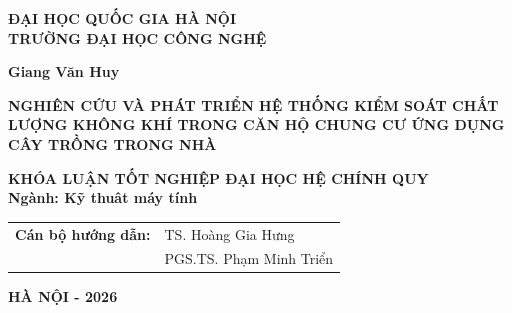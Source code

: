 \begin{titlepage}

	\begin{center}
		{\fontsize{12}{1.3}\selectfont \textbf{ĐẠI HỌC QUỐC GIA HÀ NỘI\\TRƯỜNG ĐẠI HỌC CÔNG NGHỆ}}

		\vspace{1.55cm}
		{\fontsize{14}{1.3}\selectfont \textbf{Giang Văn Huy}}

        \vspace{1.5cm}

        {\fontsize{18pt}{18.8pt}\selectfont \textbf{NGHIÊN CỨU VÀ PHÁT TRIỂN HỆ THỐNG KIỂM SOÁT CHẤT LƯỢNG KHÔNG KHÍ TRONG CĂN HỘ CHUNG CƯ ỨNG DỤNG CÂY TRỒNG TRONG NHÀ}}

		\vspace{2.5cm}

        {\fontsize{14}{1.3}\selectfont \textbf{KHÓA LUẬN TỐT NGHIỆP ĐẠI HỌC HỆ CHÍNH QUY\\ \vspace{0.23cm} Ngành: Kỹ thuât máy tính}}
        \vspace{2.0cm}
\begin{flushleft}
\hspace*{1.0cm}
\begin{tabular}{ll}
\fontsize{14}{1.3}\selectfont\textbf{Cán bộ hướng dẫn:} 
& \fontsize{14}{1.3}\selectfont TS. Hoàng Gia Hưng \\
& \fontsize{14}{1.3}\selectfont PGS.TS. Phạm Minh Triển \\[0.25cm]

\end{tabular}
\end{flushleft}

		\vfill

		{\fontsize{12}{1.3}\selectfont \textbf{HÀ NỘI - 2026}}
	\end{center}
\end{titlepage}
